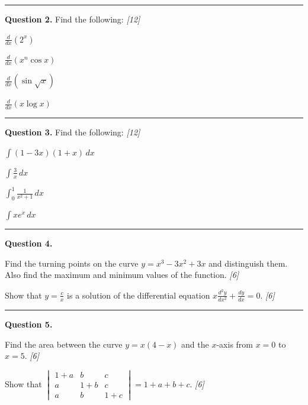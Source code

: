 \documentclass[11pt,a4paper]{article}
\newcommand{\pts}[1]{\hfill   \textit{[#1]}}
\begin{document}
\medskip\rule{\linewidth}{0.2pt}

\medskip


\noindent   \textbf{Question 2.} Find the following: \pts{12}

\begin{parts}
  \item $\frac{d}{dx}(2^x)$
  \item $\frac{d}{dx}(x^n \cos x)$
  \item $\frac{d}{dx}(\sin \sqrt{x})$
  \item $\frac{d}{dx}(x \log x)$
\end{parts}

\medskip\rule{\linewidth}{0.2pt}

\medskip


\noindent   \textbf{Question 3.} Find the following: \pts{12}

\begin{parts}
  \item $\int (1-3x)(1+x) \, dx$
  \item $\int \frac{3}{x} \, dx$
  \item $\int_0^1 \frac{1}{x^2+1} \, dx$
  \item $\int x e^x \, dx$
\end{parts}

\medskip\rule{\linewidth}{0.2pt}

\medskip


\noindent   \textbf{Question 4.}

\begin{parts}
  \item Find the turning points on the curve $y = x^3 - 3x^2 + 3x$ and distinguish them. Also find the maximum and minimum values of the function. \pts{6}
  \item Show that $y = \frac{c}{x}$ is a solution of the differential equation $x \frac{d^2y}{dx^2} + \frac{dy}{dx} = 0$. \pts{6}
\end{parts}

\medskip\rule{\linewidth}{0.2pt}

\medskip


\noindent   \textbf{Question 5.}

\begin{parts}
  \item Find the area between the curve $y = x(4-x)$ and the $x$-axis from $x=0$ to $x=5$. \pts{6}
  \item Show that $
\begin{vmatrix} 1+a & b & c \\ a & 1+b & c \\ a & b & 1+c \end{vmatrix} = 1 + a + b + c$. \pts{6}
\end{parts}
\end{document}
